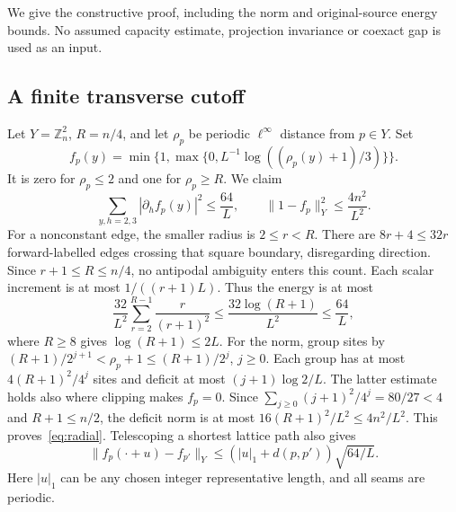 \documentclass[11pt,a4paper]{article}
\newcommand{\Z}{\mathbb Z}
\newcommand{\norm}[1]{\lVert#1\rVert}
\begin{document}
We give the constructive proof, including the norm and original-source
energy bounds. No assumed capacity estimate, projection invariance or
coexact gap is used as an input.

\subsection{A finite transverse cutoff}
Let $Y=\Z_n^2$, $R=n/4$, and let $\rho_p$ be periodic $\ell^\infty$
distance from $p\in Y$. Set
\[
 f_p(y)=\min\{1,\max\{0,L^{-1}\log((\rho_p(y)+1)/3)\}\}.
\]
It is zero for $\rho_p\leq2$ and one for $\rho_p\geq R$. We claim
\begin{equation}\label{eq:radial}
 \sum_{y,h=2,3}|\partial_h f_p(y)|^2\leq\frac{64}{L},
 \qquad \norm{1-f_p}_Y^2\leq\frac{4n^2}{L^2}.
\end{equation}
For a nonconstant edge, the smaller radius is $2\leq r<R$. There are
$8r+4\leq32r$ forward-labelled edges crossing that square boundary,
disregarding direction. Since $r+1\leq R\leq n/4$, no antipodal ambiguity
enters this count. Each scalar increment is at most $1/((r+1)L)$.
Thus the energy is at most
\[
 \frac{32}{L^2}\sum_{r=2}^{R-1}\frac{r}{(r+1)^2}
 \leq\frac{32\log(R+1)}{L^2}\leq\frac{64}{L},
\]
where $R\geq8$ gives $\log(R+1)\leq2L$.
For the norm, group sites by
$(R+1)/2^{j+1}<\rho_p+1\leq(R+1)/2^j$, $j\geq0$.
Each group has at most $4(R+1)^2/4^j$ sites and deficit at most
$(j+1)\log2/L$. The latter estimate holds also where clipping makes
$f_p=0$. Since $\sum_{j\geq0}(j+1)^2/4^j=80/27<4$ and $R+1\leq n/2$,
the deficit norm is at most $16(R+1)^2/L^2\leq4n^2/L^2$.
This proves~\eqref{eq:radial}. Telescoping a shortest lattice path also gives
\begin{equation}\label{eq:singletranslation}
 \norm{f_p(\cdot+u)-f_{p'}}_Y
 \leq (|u|_1+d(p,p'))\sqrt{64/L}.
\end{equation}
Here $|u|_1$ can be any chosen integer representative length, and all seams
are periodic.
\end{document}
